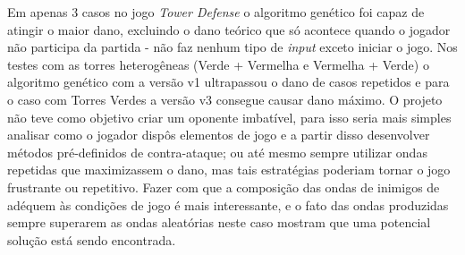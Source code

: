 Em apenas 3 casos no jogo \textit{Tower Defense} o algoritmo genético foi capaz de atingir o maior dano, excluindo o dano teórico que só acontece quando o jogador não participa da partida - não faz nenhum tipo de \textit{input} exceto iniciar o jogo. Nos testes com as torres heterogêneas (Verde + Vermelha e Vermelha + Verde) o algoritmo genético com a versão v1 ultrapassou o dano de casos repetidos e para o caso com Torres Verdes a versão v3 consegue causar dano máximo. O projeto não teve como objetivo criar um oponente imbatível, para isso seria mais simples analisar como o jogador dispôs elementos de jogo e a partir disso desenvolver métodos pré-definidos de contra-ataque; ou até mesmo sempre utilizar ondas repetidas que maximizassem o dano, mas tais estratégias poderiam tornar o jogo frustrante ou repetitivo. Fazer com que a composição das ondas de inimigos de adéquem às condições de jogo é mais interessante, e o fato das ondas produzidas sempre superarem as ondas aleatórias neste caso mostram que uma potencial solução está sendo encontrada.

